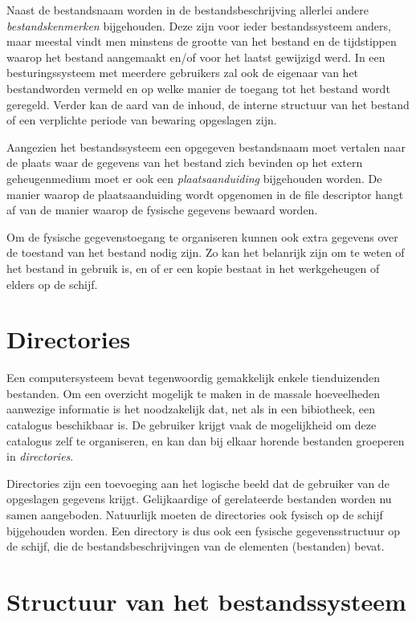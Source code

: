 Naast de bestandsnaam worden in de bestandsbeschrijving allerlei
andere \emph{bestandskenmerken} bijgehouden. Deze zijn
voor ieder bestandssysteem anders, maar meestal vindt men minstens de
grootte van het bestand en de tijdstippen waarop het bestand aangemaakt
en/of voor het laatst gewijzigd werd. In een besturingssysteem met
meerdere gebruikers zal ook de eigenaar van het bestandworden vermeld en
op welke manier de toegang tot het bestand wordt geregeld. Verder kan de
aard van de inhoud, de interne structuur van het bestand of een
verplichte periode van bewaring opgeslagen zijn.

Aangezien het bestandssysteem een opgegeven bestandsnaam moet
vertalen naar de plaats waar de gegevens van het bestand zich bevinden
op het extern geheugenmedium moet er ook een
\emph{plaatsaanduiding} bijgehouden worden. De manier
waarop de plaatsaanduiding wordt opgenomen in de file descriptor hangt
af van de manier waarop de fysische gegevens bewaard worden.

Om de fysische gegevenstoegang te organiseren kunnen ook extra
gegevens over de toestand van het bestand nodig zijn. Zo kan het
belanrijk zijn om te weten of het bestand in gebruik is, en of er een
kopie bestaat in het werkgeheugen of elders op de schijf.

\section{Directories}

Een computersysteem bevat tegenwoordig gemakkelijk enkele
tienduizenden bestanden. Om een overzicht mogelijk te maken in de
massale hoeveelheden aanwezige informatie is het noodzakelijk dat, net
als in een bibiotheek, een catalogus beschikbaar is. De gebruiker krijgt
vaak de mogelijkheid om deze catalogus zelf te organiseren, en kan dan
bij elkaar horende bestanden groeperen in
\emph{directories}.

Directories zijn een toevoeging aan het logische beeld dat de
gebruiker van de opgeslagen gegevens krijgt. Gelijkaardige of
gerelateerde bestanden worden nu samen aangeboden. Natuurlijk moeten de
directories ook fysisch op de schijf bijgehouden worden. Een directory
is dus ook een fysische gegevensstructuur op de schijf, die de
bestandsbeschrijvingen van de elementen (bestanden) bevat.

\section{Structuur van het bestandssysteem}

